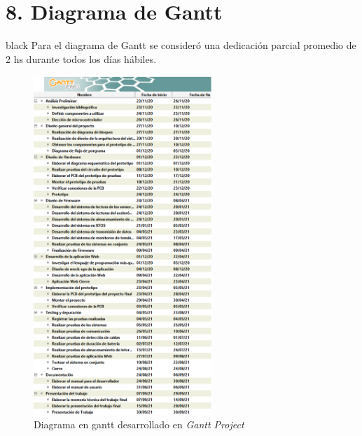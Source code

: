 \documentclass[11pt]{charter}
\begin{document}
\section{8. Diagrama de Gantt}
\label{sec:gantt}
\vspace{-10px}
\begin{consigna}{black}
Para el diagrama de Gantt se consideró una dedicación parcial promedio de 2 hs durante todos los días hábiles.

\begin{figure}[htpb]
\centering 
\centering 
\includegraphics[width=0.60\textwidth]{./Figuras/DiagramaGantt_Nombres.png}
\caption{Diagrama en gantt desarrollado en \textit{Gantt Project}}
\label{fig:gantt1}
\end{figure}
\vspace{-25px}
\begin{figure}[!htpb]
\centering 

\end{figure}
\end{consigna}
\end{document}
